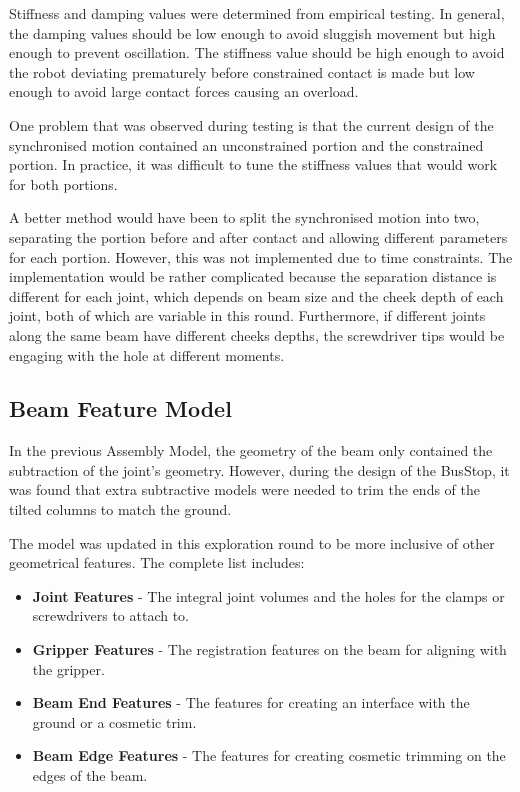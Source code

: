 Stiffness and damping values were determined from empirical testing. In general, the damping values should be low enough to avoid sluggish movement but high enough to prevent oscillation. The stiffness value should be high enough to avoid the robot deviating prematurely before constrained contact is made but low enough to avoid large contact forces causing an overload. 

One problem that was observed during testing is that the current design of the synchronised motion contained an unconstrained portion and the constrained portion. In practice, it was difficult to tune the stiffness values that would work for both portions. 

A better method would have been to split the synchronised motion into two, separating the portion before and after contact and allowing different parameters for each portion. However, this was not implemented due to time constraints. The implementation would be rather complicated because the separation distance is different for each joint, which depends on beam size and the cheek depth of each joint, both of which are variable in this round. Furthermore, if different joints along the same beam have different cheeks depths, the screwdriver tips would be engaging with the hole at different moments. 

\subsection{Beam Feature Model}
\label{subsection:exploration-4-beam-feature-model}

In the previous Assembly Model, the geometry of the beam only contained the subtraction of the joint's geometry. However, during the design of the BusStop, it was found that extra subtractive models were needed to trim the ends of the tilted columns to match the ground.

The model was updated in this exploration round to be more inclusive of other geometrical features. The complete list includes:

\begin{itemize}
    \item \textbf{Joint Features} - The integral joint volumes and the holes for the clamps or screwdrivers to attach to.
    \item \textbf{Gripper Features} - The registration features on the beam for aligning with the gripper.
    \item \textbf{Beam End Features} - The features for creating an interface with the ground or a cosmetic trim.
    \item \textbf{Beam Edge Features} - The features for creating cosmetic trimming on the edges of the beam.
\end{itemize}

